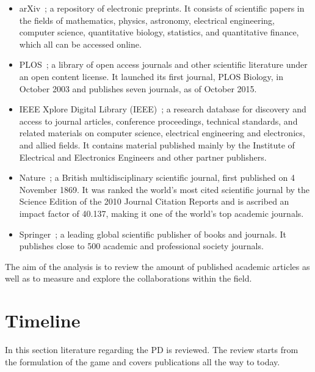 \documentclass{article}
\theoremstyle{definition}
\begin{document}
\begin{multicols}{2}
    \begin{itemize}
        \item arXiv~\cite{mckiernan2000}; a repository of electronic preprints.
        It consists of scientific
        papers in the fields of mathematics, physics, astronomy, electrical engineering,
        computer science, quantitative biology, statistics, and quantitative finance,
        which all can be accessed online.
        \item PLOS~\cite{plos}; a library of open access journals and other scientific literature
        under an open content license. It launched its first journal, PLOS Biology,
        in October 2003 and publishes seven journals, as of October 2015.
        \item IEEE Xplore Digital Library (IEEE)~\cite{ieee}; a research database for discovery
        and access to journal articles, conference proceedings, technical standards,
        and related materials on computer science, electrical engineering and electronics,
        and allied fields. It contains material published mainly by the Institute of
        Electrical and Electronics Engineers and other partner publishers. 
        \item Nature~\cite{nature}; a British multidisciplinary scientific journal,
        first published on 4 November 1869. It was ranked the world's most cited
        scientific journal by the Science Edition of the 2010 Journal Citation Reports
        and is ascribed an impact factor of 40.137, making it one of the world's
        top academic journals.
        \item Springer~\cite{springer}; a leading global scientific publisher of
        books and journals. It publishes close to 500 academic and professional
        society journals.
    \end{itemize}
\end{multicols}

The aim of the analysis is to review the amount of published academic articles
as well as to measure and explore the collaborations within the field.

\section{Timeline}\label{section:timeline}

In this section literature regarding the PD is reviewed. The
review starts from the formulation of the game and covers publications all the
way to today.
\end{document}
